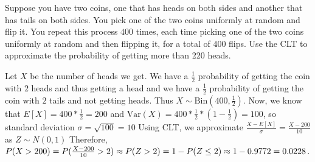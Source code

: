 \question Suppose you have two coins, one that has heads on both sides and another that has tails on both sides. You pick one of the two coins uniformly at random and flip it. You repeat this process $400$ times, each time picking one of the two coins uniformly at random and then flipping it, for a total of $400$ flips. \newline 
Use the CLT to approximate the probability of getting more than 220 heads.
\begin{solution}[2.5cm]
Let $X$ be the number of heads we get. We have a $\frac{1}{2}$ probability of getting the coin with $2$ heads and thus getting a head and we have a $\frac{1}{2}$ probability of getting the coin with $2$ tails and not getting heads. Thus $X \mathtt{\sim} \mathrm{Bin}(400, \frac{1}{2})$. \newline
Now, we know that $E[X] = 400 * \frac{1}{2} = 200$ and $\mathrm{Var}(X) = 400 * \frac{1}{2} * (1-\frac{1}{2}) = 100$, so standard deviation $\sigma = \sqrt{100} = 10$ \newline 
Using CLT, we approximate $\frac{X - E[X]}{\sigma} = \frac{X - 200}{10}$ as $Z \mathtt{\sim}N(0, 1)$ \newline
Therefore, $P(X > 200)  = P(\frac{X - 200}{10} > 2) \approx P(Z > 2) = 1 - P(Z \leq 2) \approx 1 - 0.9772 \\ = 0.0228$.
\end{solution}   